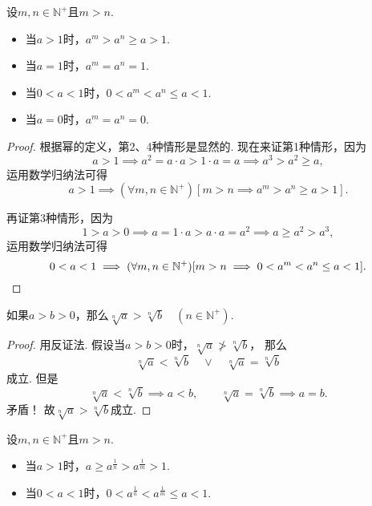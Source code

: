 \begin{corollary}\label{theorem:不等式.正整数次幂的序}
设\(m,n\in\mathbb{N}^+\)且\(m>n\).
\begin{itemize}
	\item 当\(a>1\)时，\(a^m > a^n \geq a > 1\).
	\item 当\(a=1\)时，\(a^m = a^n = 1\).
	\item 当\(0<a<1\)时，\(0 < a^m < a^n \leq a < 1\).
	\item 当\(a=0\)时，\(a^m = a^n = 0\).
\end{itemize}
\begin{proof}
根据幂的定义，第2、4种情形是显然的.
现在来证第1种情形，因为\begin{equation*}
	a > 1
	\implies
	a^2 = a \cdot a > 1 \cdot a = a
	\implies
	a^3 > a^2 \geq a,
\end{equation*}
运用数学归纳法可得\begin{equation*}
	a>1
	\implies
	(\forall m,n\in\mathbb{N}^+)
	[m>n \implies a^m > a^n \geq a > 1].
\end{equation*}

再证第3种情形，因为\begin{equation*}
	1>a>0
	\implies
	a = 1 \cdot a > a \cdot a = a^2
	\implies
	a \geq a^2 > a^3,
\end{equation*}
运用数学归纳法可得\begin{equation*}
	0<a<1
	\implies
	(\forall m,n\in\mathbb{N}^+)
	[m>n \implies 0 < a^m < a^n \leq a < 1].
	\qedhere
\end{equation*}
\end{proof}
\end{corollary}

\begin{theorem}
如果\(a>b>0\)，那么\(\sqrt[n]{a} > \sqrt[n]{b} \quad (n\in\mathbb{N}^+)\).
\begin{proof}
用反证法.
假设当\(a>b>0\)时，\(\sqrt[n]{a} \ngtr \sqrt[n]{b}\)，
那么\begin{equation*}
	\sqrt[n]{a} < \sqrt[n]{b}
	\quad\lor\quad
	\sqrt[n]{a} = \sqrt[n]{b}
\end{equation*}成立.
但是\begin{equation*}
	\sqrt[n]{a} < \sqrt[n]{b} \implies a<b,
	\qquad
	\sqrt[n]{a} = \sqrt[n]{b} \implies a=b.
\end{equation*}矛盾！
故\(\sqrt[n]{a}>\sqrt[n]{b}\)成立.
\end{proof}
\end{theorem}

\begin{theorem}
设\(m,n\in\mathbb{N}^+\)且\(m>n\).
\begin{itemize}
	\item 当\(a>1\)时，\(a \geq a^{\frac1n} > a^{\frac1m} > 1\).
	\item 当\(0<a<1\)时，\(0 < a^{\frac1n} < a^{\frac1m} \leq a < 1\).
\end{itemize}
\end{theorem}

